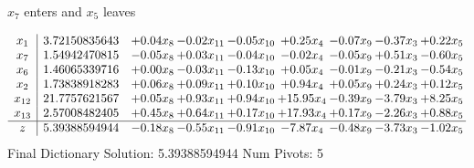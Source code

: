 \documentclass[9pt]{article}
\begin{document}
 $ x_{7} $ enters and $ x_{5} $ leaves 

 \[\begin{array}{c| c c@{\hskip 2pt} c@{\hskip 2pt} c@{\hskip 2pt} c@{\hskip 2pt} c@{\hskip 2pt} c@{\hskip 2pt} c@{\hskip 2pt} }
 x_{1}   &  3.72150835643 & +  0.04 x_{8} & -0.02 x_{11} & -0.05 x_{10} & +  0.25 x_{4} & -0.07 x_{9} & -0.37 x_{3} & +  0.22 x_{5}\\
 x_{7}   &  1.54942470815 & -0.05 x_{8} & +  0.03 x_{11} & -0.04 x_{10} & -0.02 x_{4} & -0.05 x_{9} & +  0.51 x_{3} & -0.60 x_{5}\\
 x_{6}   &  1.46065339716 & +  0.00 x_{8} & -0.03 x_{11} & -0.13 x_{10} & +  0.05 x_{4} & -0.01 x_{9} & -0.21 x_{3} & -0.54 x_{5}\\
 x_{2}   &  1.73838918283 & +  0.06 x_{8} & +  0.09 x_{11} & +  0.10 x_{10} & +  0.94 x_{4} & +  0.05 x_{9} & +  0.24 x_{3} & +  0.12 x_{5}\\
 x_{12}   &  21.7757621567 & +  0.05 x_{8} & +  0.93 x_{11} & +  0.94 x_{10} & + 15.95 x_{4} & -0.39 x_{9} & -3.79 x_{3} & +  8.25 x_{5}\\
 x_{13}   &  2.57008482405 & +  0.45 x_{8} & +  0.64 x_{11} & +  0.17 x_{10} & + 17.93 x_{4} & +  0.17 x_{9} & -2.26 x_{3} & +  0.88 x_{5}\\
\hline
z    &  5.39388594944 & -0.18 x_{8} & -0.55 x_{11} & -0.91 x_{10} & -7.87 x_{4} & -0.48 x_{9} & -3.73 x_{3} & -1.02 x_{5}\\
\end{array}\]
Final Dictionary
Solution:  5.39388594944
Num Pivots:  5
\end{document}
